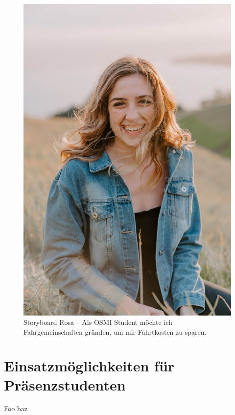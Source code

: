 \documentclass{article}
\begin{document}
\begin{figure}[h]
	\includegraphics[angle=90,width=\textwidth]{rosa}
	\centering
	\caption{Storyboard Rosa – Als OSMI Student möchte ich Fahrgemeinschaften gründen, um mir Fahrtkosten zu sparen.}
\end{figure}

\newpage

\section{Einsatzmöglichkeiten für Präsenzstudenten}

Foo baz
\end{document}
